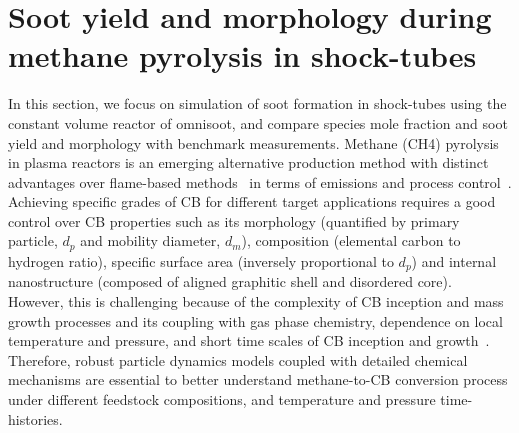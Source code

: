 \section{Soot yield and morphology during methane pyrolysis in shock-tubes}

In this section, we focus on simulation of soot formation in shock-tubes using the constant volume reactor of omnisoot, and compare species mole fraction and soot yield and morphology with benchmark measurements. 
Methane (CH4) pyrolysis in plasma reactors is an emerging alternative production method with distinct advantages over flame-based methods~\citep{fulcheri2023energy} in terms of emissions and process control~\citep{cho2004conversion}. Achieving specific grades of CB for different target applications requires a good control over CB properties such as its morphology (quantified by primary particle, $d_p$ and mobility diameter, $d_m$), composition (elemental carbon to hydrogen ratio), specific surface area (inversely proportional to $d_p$) and internal nanostructure (composed of aligned graphitic shell and disordered core). However, this is challenging because of the complexity of CB inception and mass growth processes and its coupling with gas phase chemistry, dependence on local temperature and pressure, and short time scales of CB inception and growth~\citep{violi2005relative}. Therefore, robust particle dynamics models coupled with detailed chemical mechanisms are essential to better understand methane-to-CB conversion process under different feedstock compositions, and temperature and pressure time-histories.

